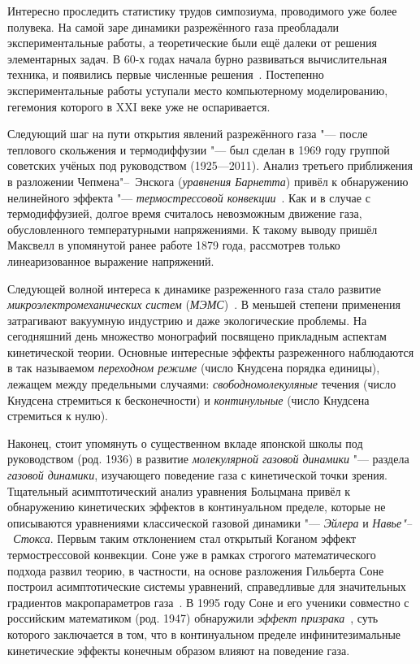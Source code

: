 \documentclass[a4paper, 12pt, oneside]{article} %
\begin{document}
Интересно проследить статистику трудов симпозиума, проводимого уже более
полувека. На самой заре динамики разрежённого газа преобладали
экспериментальные работы, а теоретические были ещё далеки от решения
элементарных задач. В 60-х годах начала бурно развиваться вычислительная
техника, и появились первые численные
решения~\cite{cercignani1978applications}. Постепенно экспериментальные
работы уступали место компьютерному моделированию, гегемония которого в
XXI веке уже не оспаривается.

Следующий шаг на пути открытия явлений разрежённого газа "---
после теплового скольжения и термодиффузии "--- был сделан в 1969 году
группой советских учёных под руководством 
(1925---2011). Анализ третьего приближения в разложении
Чепмена"--~Энскога (\emph{уравнения Барнетта}) привёл к обнаружению
нелинейного эффекта "--- \emph{термострессовой
конвекции}~\cite{kogan1976stresses}. Как и в случае с термодиффузией,
долгое время считалось невозможным движение газа, обусловленного
температурными напряжениями. К такому выводу пришёл Максвелл в
упомянутой ранее работе 1879 года, рассмотрев только линеаризованное
выражение напряжений.  

Следующей волной интереса к динамике разреженного газа стало развитие
\emph{микроэлектромеханических систем}
(\emph{МЭМС})~\cite{karniadakis2006microflows}. В меньшей степени
применения затрагивают вакуумную индустрию и даже экологические
проблемы. На сегодняшний день множество монографий посвящено прикладным
аспектам кинетической теории. Основные интересные эффекты разреженного
наблюдаются в так называемом \emph{переходном режиме} (число Кнудсена
порядка единицы), лежащем между предельными случаями:
\emph{свободномолекуляные} течения (число Кнудсена стремиться к
бесконечности) и \emph{континульные} (число Кнудсена стремиться к нулю).

Наконец, стоит упомянуть о существенном вкладе японской школы под
руководством  (род. 1936) в развитие
\emph{молекулярной газовой динамики} "--- раздела \emph{газовой
динамики}, изучающего поведение газа с кинетической точки зрения.
Тщательный асимптотический анализ уравнения Больцмана привёл к
обнаружению кинетических эффектов в континуальном пределе, которые не
описываются уравнениями классической газовой динамики "--- \emph{Эйлера}
и \emph{Навье"--~Стокса}. Первым таким отклонением стал открытый Коганом
эффект термострессовой конвекции. Соне уже в рамках строгого
математического подхода развил теорию, в частности, на основе разложения
Гильберта Соне построил асимптотические системы уравнений, справедливые
для значительных градиентов макропараметров
газа~\cite{sone2007molecular}. В 1995 году Соне и его ученики совместно
с российским математиком  (род. 1947)
обнаружили \emph{эффект призрака}~\cite{sone1996ghost}, суть которого
заключается в том, что в континуальном пределе инфинитезимальные
кинетические эффекты конечным образом влияют на поведение газа.
 
\end{document}
